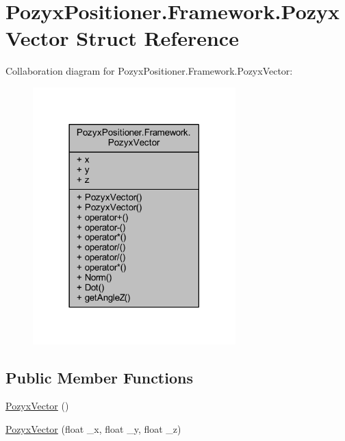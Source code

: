 \hypertarget{struct_pozyx_positioner_1_1_framework_1_1_pozyx_vector}{}\section{Pozyx\+Positioner.\+Framework.\+Pozyx\+Vector Struct Reference}
\label{struct_pozyx_positioner_1_1_framework_1_1_pozyx_vector}


Collaboration diagram for Pozyx\+Positioner.\+Framework.\+Pozyx\+Vector\+:
\nopagebreak
\begin{figure}[H]
\begin{center}
\leavevmode
\includegraphics[width=222pt]{struct_pozyx_positioner_1_1_framework_1_1_pozyx_vector__coll__graph}
\end{center}
\end{figure}
\subsection*{Public Member Functions}
\begin{DoxyCompactItemize}
\item 
\hyperlink{struct_pozyx_positioner_1_1_framework_1_1_pozyx_vector_ad7d351f29e438d7c2c914849c010df50}{Pozyx\+Vector} ()
\item 
\hyperlink{struct_pozyx_positioner_1_1_framework_1_1_pozyx_vector_aefc563d4720d301eaf6bd2cb62858c01}{Pozyx\+Vector} (float \+\_\+x, float \+\_\+y, float \+\_\+z)
\end{DoxyCompactItemize}
